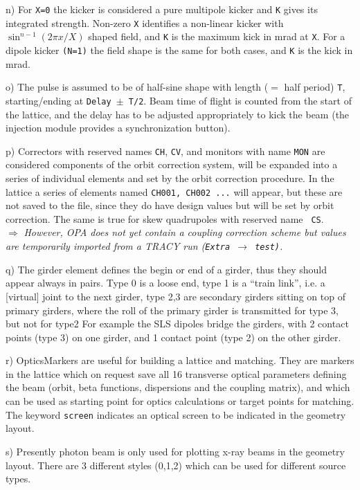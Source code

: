 \documentclass[12pt]{article}
\newcommand\todo[1]{$\Longrightarrow$ {\em #1} }
\begin{document}
n) For {\tt X=0} the kicker is considered a pure multipole kicker and {\tt K} gives its integrated strength. Non-zero {\tt X} identifies a non-linear kicker with $\sin^{n-1}(2\pi x/X)$ shaped field, and {\tt K} is the maximum kick in mrad at {\tt X}. For a dipole kicker {\tt (N=1)} the field shape is the same for both cases, and {\tt K} is the kick in mrad.

o) The pulse is assumed to be of half-sine shape with length ($=$ half period) {\tt T}, starting/ending at {\tt Delay $\pm$ T/2}. Beam time of flight is counted from the start of the lattice, and the delay has to be adjusted appropriately to kick the beam (the injection module provides a synchronization button).

p) Correctors with reserved names {\tt CH}, {\tt CV}, and monitors with name {\tt MON} are considered components of the orbit correction system, will be expanded into a series of individual elements and set by the orbit correction procedure. In the lattice a series of elements named {\tt CH001, CH002 ...} will appear, but these are not saved to the file, since they do have design values but will be set by orbit correction. The same is true for skew quadrupoles with reserved name {\tt
CS}. \\
\todo{However, OPA does not yet contain a coupling correction scheme but values are temporarily imported from a TRACY run  ({\tt Extra $\rightarrow$ test)}.}

q) The girder element defines the begin or end of a girder, thus they should appear always in pairs. Type 0 is a loose end, type 1 is a ``train link'', i.e. a [virtual] joint to the next girder, type 2,3 are secondary girders sitting on top of primary girders, where the roll of the primary girder is transmitted for type 3, but not for type2 For example the SLS dipoles bridge the girders, with 2 contact points (type 3) on one girder, and 1 contact point (type 2) on the other girder.

r) OpticsMarkers are useful for building a lattice and matching. They are markers in the lattice which on request save all 16 transverse optical parameters defining the beam (orbit, beta functions, dispersions and the coupling matrix), and which can be used as starting point for optics calculations or target points for matching. The keyword {\tt screen} indicates an optical screen to be indicated in the geometry layout.

s) Presently photon beam is only used for plotting x-ray beams in the geometry layout. There are 3 different styles (0,1,2) which can be used for different source types.
\end{document}
